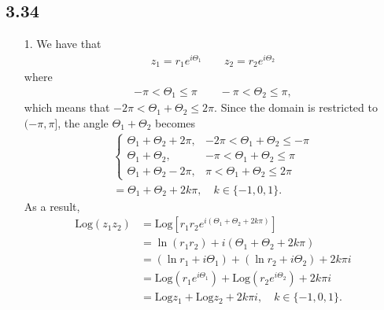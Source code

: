 \documentclass[a4paper,12pt]{article}
\begin{document}
\subsection*{3.34}
\begin{enumerate}
    \item[1.]
        We have that
        \begin{align*}
            z_1 = r_1 e^{i \Theta_1} \qquad z_2 = r_2 e^{i \Theta_2}
        \end{align*}
        where
        \begin{align*}
            -\pi < \Theta_1 \leq \pi \qquad -\pi < \Theta_2 \leq \pi,
        \end{align*}
        which means that $-2\pi < \Theta_1 + \Theta_2 \leq 2\pi$. Since the domain is restricted to $(-\pi, \pi]$, the angle $\Theta_1 + \Theta_2$ becomes
        \begin{gather*}
            \begin{cases}
                \Theta_1 + \Theta_2 + 2\pi, &-2\pi < \Theta_1 + \Theta_2 \leq -\pi \\
                \Theta_1 + \Theta_2, &-\pi < \Theta_1 + \Theta_2 \leq \pi \\
                \Theta_1 + \Theta_2 - 2\pi, &\pi < \Theta_1 + \Theta_2 \leq 2\pi
            \end{cases} \\
            = \Theta_1 + \Theta_2 + 2k\pi, \quad k \in \{ -1, 0, 1 \}.
        \end{gather*}
        As a result,
        \begin{align*}
            \text{Log}(z_1 z_2) &= \text{Log} \left[ r_1 r_2 e^{i(\Theta_1 + \Theta_2 + 2k\pi)} \right] \\
            &= \ln(r_1 r_2) + i(\Theta_1 + \Theta_2 + 2k\pi) \\
            &= (\ln r_1 + i \Theta_1) + (\ln r_2 + i \Theta_2) + 2k\pi i \\
            &= \text{Log} \left( r_1 e^{i \Theta_1} \right) + \text{Log} \left( r_2 e^{i \Theta_2} \right) + 2k\pi i \\
            &= \text{Log} z_1 + \text{Log} z_2 + 2k\pi i, \quad k \in \{ -1, 0, 1 \}.
        \end{align*}
\end{enumerate}
\end{document}
